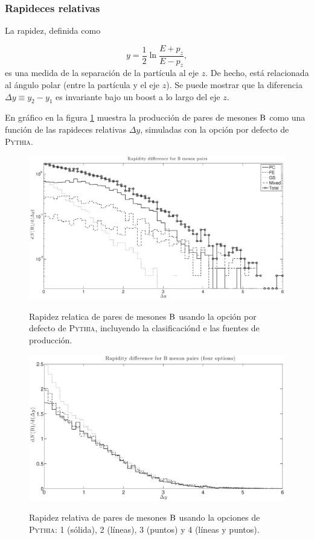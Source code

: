 \documentclass[a4paper,12pt]{article}
\begin{document}
\subsubsection{Rapideces relativas}

La rapidez, definida como

$$
y =\frac12 \ln \frac{E+p_z}{E-p_z},
$$
es una medida de la separación de la partícula al eje $z$. De hecho, está relacionada al ángulo polar (entre la partícula y el eje $z$). Se puede mostrar que la diferencia $\Delta y \equiv y_2 - y_1$ es invariante bajo un boost a lo largo del eje $z$.

En gráfico en la figura \ref{fig:BBYOp1} muestra la producción de pares de mesones $\B$ como una función de las rapideces relativas $\Delta y$, simuladas con la opción por defecto de \textsc{Pythia}.

\begin{figure}[!h]
\centering
\caption[Rapidez relativa de pares de mesones $\B$. Opción por defecto de \textsc{Pythia}.]{Rapidez relatica de pares de mesones $\B$ usando la opción por defecto de \textsc{Pythia}, incluyendo la clasificaciónd e las fuentes de producción.}
\includegraphics[width=15cm]{BBYOp1}
\label{fig:BBYOp1}
\end{figure}

\begin{figure}[!h]
\centering
\caption[[Rapidez relativa de pares de mesones $\B$. Cuatro opciones de \textsc{Pythia}.]{Rapidez relativa de pares de mesones $\B$ usando la opciones de \textsc{Pythia}:  1 (sólida), 2 (líneas), 3 (puntos) y 4 (líneas y puntos).}
\includegraphics[width=15cm]{BBY4Op}
\label{fig:BBY4Op}
\end{figure}
\end{document}
